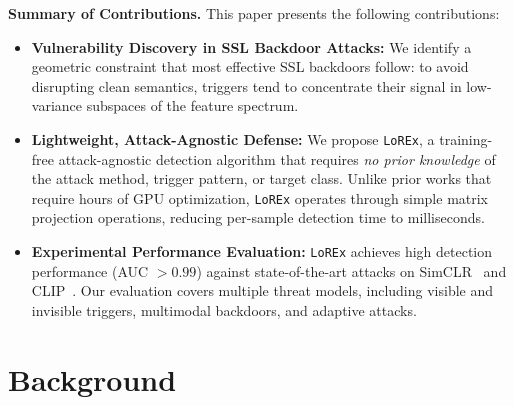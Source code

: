 \documentclass[letterpaper,twocolumn,10pt]{article}
\newcommand{\mn}[1]{\textcolor{orange!90!black}{Mahmoud: #1}}
\begin{document}
\par \textbf{Summary of Contributions.} 
This paper presents the following contributions:
\begin{itemize}[leftmargin=0pt]
    \item \textbf{Vulnerability Discovery in SSL Backdoor Attacks:} We identify a geometric constraint that most effective SSL backdoors follow: to avoid disrupting clean semantics, triggers tend to concentrate their signal in low-variance subspaces of the feature spectrum.  
    \item \textbf{Lightweight, Attack-Agnostic Defense:} We propose \texttt{LoREx}, a training-free attack-agnostic detection algorithm that requires \textit{no prior knowledge} of the attack method, trigger pattern, or target class. Unlike prior works that require hours of GPU optimization, \texttt{LoREx} operates through simple matrix projection operations, reducing per-sample detection time to milliseconds.
    \item \textbf{Experimental Performance Evaluation:} \texttt{LoREx} achieves high detection performance (AUC $>0.99$) against state-of-the-art attacks on SimCLR~\cite{chen2020simclr} and CLIP~\cite{CLIP}. Our evaluation covers multiple threat models, including visible and invisible triggers, multimodal backdoors, and adaptive attacks. 
\end{itemize}



\section{Background}
\end{document}
